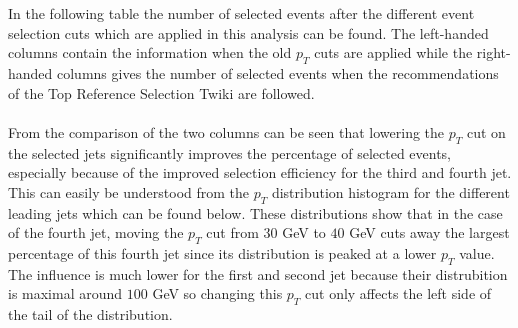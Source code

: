 \documentclass[a4paper,12pt]{report}
\begin{document}
In the following table the number of selected events after the different event selection cuts which are applied in this analysis can be found. The left-handed columns contain the information when the old $p_T$ cuts are applied while the right-handed columns gives the number of selected events when the recommendations of the Top Reference Selection Twiki are followed.\\
\\
From the comparison of the two columns can be seen that lowering the $p_T$ cut on the selected jets significantly improves the percentage of selected events, especially because of the improved selection efficiency for the third and fourth jet. This can easily be understood from the $p_T$ distribution histogram for the different leading jets which can be found below.
These distributions show that in the case of the fourth jet, moving the $p_T$ cut from $30$ GeV to $40$ GeV cuts away the largest percentage of this fourth jet since its distribution is peaked at a lower $p_T$ value. The influence is much lower for the first and second jet because their distrubition is maximal around $100$ GeV so changing this $p_T$ cut only affects the left side of the tail of the distribution.\\
\end{document}
